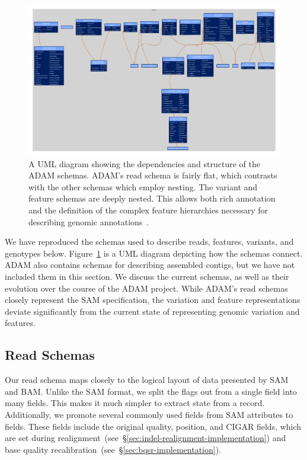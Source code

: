 \documentclass[phd]{ucbthesis}
\begin{document}
\begin{figure}[h]
\begin{center}
\includegraphics[width=0.95\linewidth]{graphs/bdg.pdf}
\end{center}
\caption{A UML diagram showing the dependencies and structure of the ADAM
  schemas. ADAM's read schema is fairly flat, which contrasts with the other
  schemas which employ nesting. The variant and feature schemas are deeply
  nested. This allows both rich annotation and the definition of the complex
  feature hierarchies necessary for describing genomic
  annotations~\cite{eilbeck05}.}
\label{fig:schemas}
\end{figure}

We have reproduced the schemas used to describe reads, features, variants, and
genotypes below. Figure~\ref{fig:schemas} is a UML diagram depicting how the
schemas connect. \textsc{ADAM} also contains schemas for describing assembled
contigs, but we have not included them in this section. We discuss the current
schemas, as well as their evolution over the course of the \textsc{ADAM}
project. While \textsc{ADAM}'s read schemas closely represent the \textsc{SAM}
specification, the variation and feature representations deviate significantly
from the current state of representing genomic variation and features.

\subsection{Read Schemas}
\label{sec:read-schemas}

Our read schema maps closely to the logical layout of data presented by
\textsc{SAM} and \textsc{BAM}. Unlike the \textsc{SAM} format, we split the
flags out from a single field into many fields. This makes it much simpler to
extract state from a record. Additionally, we promote several commonly used
fields from \textsc{SAM} attributes to fields. These fields include the original
quality, position, and CIGAR fields, which are set during
realignment~(see~\S\ref{sec:indel-realignment-implementation}) and base quality
recalibration~(see~\S\ref{sec:bqsr-implementation}).
\end{document}
